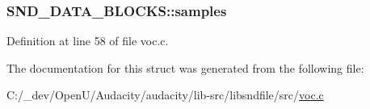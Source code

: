 \subsubsection[{\texorpdfstring{samples}{samples}}]{ S\+N\+D\+\_\+\+D\+A\+T\+A\+\_\+\+B\+L\+O\+C\+K\+S\+::samples}\hypertarget{struct_s_n_d___d_a_t_a___b_l_o_c_k_s_adc72e552bb969b519d9052af33088700}{}\label{struct_s_n_d___d_a_t_a___b_l_o_c_k_s_adc72e552bb969b519d9052af33088700}


Definition at line 58 of file voc.\+c.



The documentation for this struct was generated from the following file\+:\begin{DoxyCompactItemize}
\item 
C\+:/\+\_\+dev/\+Open\+U/\+Audacity/audacity/lib-\/src/libsndfile/src/\hyperlink{voc_8c}{voc.\+c}\end{DoxyCompactItemize}
